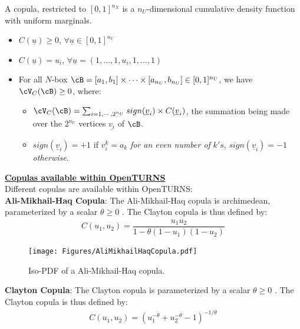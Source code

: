 {  A copula, restricted to $[0,1]^{n_X}$ is a $n_U$-dimensional cumulative density function with uniform marginals.

  \begin{itemize}
  \item $C(\underline{u}) \geq 0$,  $\forall \underline{u} \in [0,1]^{n_U}$
  \item $C(\underline{u}) = u_i$, $\forall \underline{u}=(1,\ldots,1,u_i,1,\ldots,1)$
  \item For all $N$-box $\cB = [a_1,b_1] \times \cdots \times [a_{n_U},b_{n_U}] \in [0,1]^{n_U}$, we have $\cV_C(\cB) \geq 0$,     where:
    \begin{itemize}
    \item       $\cV_C(\cB) = \sum_{i=1,\cdots, 2^{n_U}} sign(\underline{v}_i) \times C(\underline{v}_i)$, the summation being made over the $2^{n_U}$ vertices $\underline{v_i}$ of $\cB$.
    \item       $sign(\underline{v}_i)= +1$ if $v_i^k = a_k$ \textit{for an even number of} $k's$, $sign(\underline{v}_i)= -1$ \textit{otherwise}.\\
    \end{itemize}
  \end{itemize}






  \underline{\textbf{Copulas available within OpenTURNS}}\\

  Different copulas are available within OpenTURNS:\\

  {\bf Ali-Mikhail-Haq Copula}: The Ali-Mikhail-Haq copula is archimedean, parameterized by a scalar $\theta \geq 0 $ . The Clayton copula is thus defined by:
  \begin{align*}
    C(u_1, u_2) = \displaystyle \dfrac{u_1u_2}{1-\theta(1-u_1)(1-u_2)}
  \end{align*}

  \begin{figure}[H]
    \begin{center}
      \texttt{[image: Figures/AliMikhailHaqCopula.pdf]}
      \caption{Iso-PDF of a Ali-Mikhail-Haq  copula.}
    \end{center}
  \end{figure}


  {\bf Clayton Copula}: The Clayton copula is parameterized by a scalar $\theta \geq 0 $ . The Clayton copula is thus defined by:
  \begin{align*}
    C(u_1, u_2) =\displaystyle \left(u_1^{-\theta}+u_2^{-\theta}-1\right)^{-1/\theta}
  \end{align*}



}
